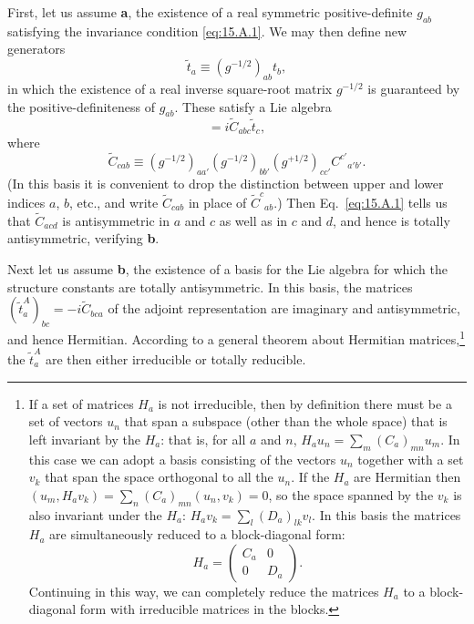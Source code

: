 First, let us assume \textbf{a}, the existence of a real symmetric positive-definite $g_{ab}$ satisfying the invariance condition \eqref{eq:15.A.1}. We may then define new generators
\begin{equation}
 \widetilde t_a\equiv(g^{-1/2})_{ab}t_b,
 \tag{15.A.3}\label{eq:15.A.3}
\end{equation}
in which the existence of a real inverse square-root matrix $g^{-1/2}$ is guaranteed by the positive-definiteness of $g_{ab}$. These satisfy a Lie algebra
\begin{equation}
 [\widetilde t_a,\widetilde t_b]
 =i\widetilde C_{abc}\widetilde t_c,
 \tag{15.A.4}\label{eq:15.A.4}
\end{equation}
where
\begin{equation}
 \widetilde C_{cab}
 \equiv(g^{-1/2})_{aa'}(g^{-1/2})_{bb'}
 (g^{+1/2})_{cc'}C^{c'}{}_{a'b'}.
 \tag{15.A.5}\label{eq:15.A.5}
\end{equation}
(In this basis it is convenient to drop the distinction between upper and lower indices $a$, $b$, etc., and write $\widetilde C_{cab}$ in place of $\widetilde C^c{}_{ab}$.) Then Eq.~\eqref{eq:15.A.1} tells us that $\widetilde C_{acd}$ is antisymmetric in $a$ and $c$ as well as in $c$ and $d$, and hence is totally antisymmetric, verifying \textbf{b}.

Next let us assume \textbf{b}, the existence of a basis for the Lie algebra for which the structure constants are totally antisymmetric. In this basis, the matrices $(\widetilde t^A_a)_{bc}=-i\widetilde C_{bca}$ of the adjoint representation are imaginary and antisymmetric, and hence Hermitian. According to a general theorem about Hermitian matrices,\footnote{If a set of matrices $H_a$ is not irreducible, then by definition there must be a set of vectors $u_n$ that span a subspace (other than the whole space) that is left invariant by the $H_a$: that is, for all $a$ and $n$, $H_a u_n=\sum_m(C_a)_{mn}u_m$. In this case we can adopt a basis consisting of the vectors $u_n$ together with a set $v_k$ that span the space orthogonal to all the $u_n$. If the $H_a$ are Hermitian then $(u_m,H_a v_k)=\sum_n(C_a)_{mn}(u_n,v_k)=0$, so the space spanned by the $v_k$ is also invariant under the $H_a$: $H_a v_k=\sum_l(D_a)_{lk}v_l$. In this basis the matrices $H_a$ are simultaneously reduced to a block-diagonal form:
\[
 H_a=\begin{pmatrix}C_a&0\\0&D_a\end{pmatrix}.
\]
Continuing in this way, we can completely reduce the matrices $H_a$ to a block-diagonal form with irreducible matrices in the blocks.} the $\widetilde t^A_a$ are then either irreducible or totally reducible.

